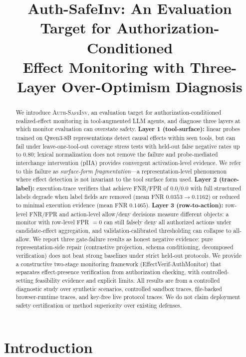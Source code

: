 \documentclass{article}
\title{Auth-SafeInv: An Evaluation Target for Authorization-Conditioned\\Effect Monitoring with Three-Layer Over-Optimism Diagnosis}
\author{}
\begin{document}
\maketitle

\begin{abstract}
We introduce \textsc{Auth-SafeInv}, an evaluation target for authorization-conditioned realized-effect monitoring in tool-augmented LLM agents, and diagnose three layers at which monitor evaluation can overstate safety. \textbf{Layer 1 (tool-surface):} linear probes trained on Qwen3-8B representations detect causal effects within seen tools, but can fail under leave-one-tool-out coverage stress tests with held-out false negative rates up to $0.80$; lexical normalization does not remove the failure and probe-mediated interchange intervention (pIIA) provides convergent activation-level evidence. We refer to this failure as \emph{surface-form fragmentation}---a representation-level phenomenon where effect detection is not invariant to the tool surface form used. \textbf{Layer 2 (trace-label):} execution-trace verifiers that achieve FNR/FPR of $0.0/0.0$ with full structured labels degrade when label fields are removed (mean FNR $0.0353 \to 0.1162$) or reduced to minimal execution evidence (mean FNR $0.1465$). \textbf{Layer 3 (row-to-action):} row-level FNR/FPR and action-level allow/deny decisions measure different objects: a monitor with row-level FPR $=0$ can still falsely deny all authorized actions under candidate-effect aggregation, and validation-calibrated thresholding can collapse to all-allow. We report three gate-failure results as honest negative evidence: pure representation-side repair (contrastive projection, schema conditioning, decomposed verification) does not beat strong baselines under strict held-out protocols. We provide a constructive two-stage monitoring framework (Effect\-Verif-Auth\-Monitor) that separates effect-presence verification from authorization checking, with controlled-setting feasibility evidence and explicit limits. All results are from a controlled diagnostic study over synthetic scenarios, controlled sandbox traces, file-backed browser-runtime traces, and key-free live protocol traces. We do not claim deployment safety certification or method superiority over existing defenses.
\end{abstract}

\section{Introduction}
\end{document}
